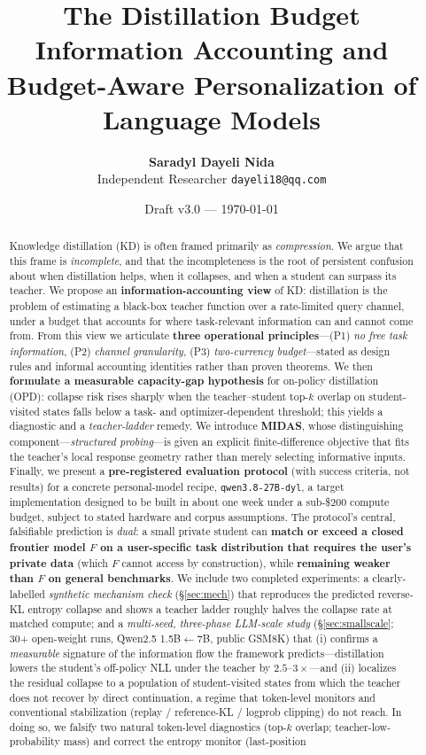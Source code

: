 \documentclass[11pt]{article}
\title{\textbf{The Distillation Budget}\\[4pt]
\large Information Accounting and Budget-Aware Personalization of Language Models}
\author{%
  \textbf{Saradyl Dayeli Nida}\\[2pt]
  Independent Researcher \quad \texttt{dayeli18@qq.com}
}
\date{Draft v3.0 --- \today}
\begin{document}
\maketitle

\begin{abstract}
Knowledge distillation (KD) is often framed primarily as \emph{compression}. We argue that this frame is \emph{incomplete}, and that the incompleteness is the root of persistent confusion about when distillation helps, when it collapses, and when a student can surpass its teacher. We propose an \textbf{information-accounting view} of KD: distillation is the problem of estimating a black-box teacher function over a rate-limited query channel, under a budget that accounts for where task-relevant information can and cannot come from. From this view we articulate \textbf{three operational principles}---(P1) \emph{no free task information}, (P2) \emph{channel granularity}, (P3) \emph{two-currency budget}---stated as design rules and informal accounting identities rather than proven theorems. We then \textbf{formulate a measurable capacity-gap hypothesis} for on-policy distillation (OPD): collapse risk rises sharply when the teacher--student top-$k$ overlap on student-visited states falls below a task- and optimizer-dependent threshold; this yields a diagnostic and a \emph{teacher-ladder} remedy. We introduce \textbf{MIDAS}, whose distinguishing component---\emph{structured probing}---is given an explicit finite-difference objective that fits the teacher's local response geometry rather than merely selecting informative inputs. Finally, we present a \textbf{pre-registered evaluation protocol} (with success criteria, not results) for a concrete personal-model recipe, \texttt{qwen3.8-27B-dyl}, a target implementation designed to be built in about one week under a sub-\$200 compute budget, subject to stated hardware and corpus assumptions. The protocol's central, falsifiable prediction is \emph{dual}: a small private student can \textbf{match or exceed a closed frontier model $F$ on a user-specific task distribution that requires the user's private data} (which $F$ cannot access by construction), while \textbf{remaining weaker than $F$ on general benchmarks}. We include two completed experiments: a clearly-labelled \emph{synthetic mechanism check} (\S\ref{sec:mech}) that reproduces the predicted reverse-KL entropy collapse and shows a teacher ladder roughly halves the collapse rate at matched compute; and a \emph{multi-seed, three-phase LLM-scale study} (\S\ref{sec:smallscale}; 30+ open-weight runs, Qwen2.5 1.5B$\leftarrow$7B, public GSM8K) that (i) confirms a \emph{measurable} signature of the information flow the framework predicts---distillation lowers the student's off-policy NLL under the teacher by $2.5$--$3\times$---and (ii) localizes the residual collapse to a population of student-visited states from which the teacher does not recover by direct continuation, a regime that token-level monitors and conventional stabilization (replay / reference-KL / logprob clipping) do not reach. In doing so, we falsify two natural token-level diagnostics (top-$k$ overlap; teacher-low-probability mass) and correct the entropy monitor (last-position 
\end{abstract}
\end{document}
